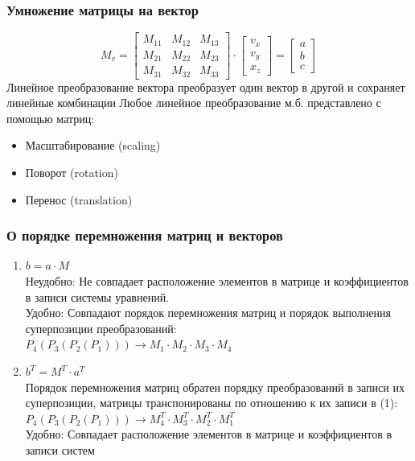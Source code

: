 \documentclass[a4paper, 14pt]{extarticle}
\begin{document}
\subsubsection{Умножение матрицы на вектор}
$$
M_v = \begin{bmatrix}
M_{11} & M_{12} & M_{13}\\
M_{21} & M_{22} & M_{23}\\
M_{31} & M_{32} & M_{33}
\end{bmatrix} \cdot \begin{bmatrix}
v_x \\ v_y \\ x_z
\end{bmatrix} = \begin{bmatrix}
a \\ b \\ c
\end{bmatrix}
$$
Линейное преобразование вектора преобразует один вектор в другой и сохраняет линейные комбинации
Любое линейное преобразование м.б. представлено с
помощью матриц:
\begin{itemize}
	\item Масштабирование (scaling)
	\item Поворот (rotation)
	\item Перенос (translation)
\end{itemize}

\subsubsection{О порядке перемножения матриц и векторов}
\begin{enumerate}
	\item $b = a \cdot M$\\
	Неудобно: Не совпадает расположение элементов в  матрице и коэффициентов в записи системы уравнений.\\
	Удобно: Совпадают порядок перемножения матриц и порядок выполнения суперпозиции преобразований: \\
	$P_4(P_3(P_2(P_1))) \rightarrow M_1 \cdot M_2 \cdot M_3 \cdot M_4$
	\item $b^T = M^T \cdot a^T$\\
	Порядок перемножения матриц обратен	порядку преобразований в записи их суперпозиции, матрицы транспонированы по отношению к их записи в (1):\\
	$P_4(P_3(P_2(P_1))) \rightarrow M_4^T \cdot M_3^T \cdot M_2^T \cdot M_1^T$\\
	Удобно: Совпадает расположение элементов в матрице и коэффициентов в записи систем
\end{enumerate}
\end{document}
